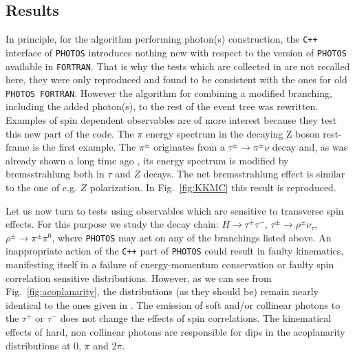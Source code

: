 \documentclass[]{Photos_interface_design}
\begin{document}
\subsection{Results}
\label{sec:results}
In principle, for the algorithm performing photon(s) construction, the {\tt C++} interface of
{\tt PHOTOS} introduces nothing new with respect to the 
version of {\tt PHOTOS} available in {\tt FORTRAN}.
That is why the  tests which are collected in \cite{Photos_tests} are not
recalled here, they were only reproduced and found to be consistent with the ones for
old {\tt PHOTOS FORTRAN}.
However the algorithm for combining a modified branching, including the added 
photon(s), to the rest of the event tree was rewritten.
Examples of spin dependent observables are of more interest because they test this new part of the code.
The $\pi$ energy spectrum in the decaying
Z boson rest-frame is the first example. 
The $\pi^\pm$ originates from a $\tau^\pm \to \pi^\pm \nu $ decay and, 
as was already shown a long time ago \cite{Boillot:1988re}, its energy spectrum is modified by bremsstrahlung both in $\tau$ and $Z$ decays. The net
bremsstrahlung  effect is similar to the one of e.g. $Z$ polarization. In Fig.~\ref{fig:KKMC} this result is reproduced.

Let us now turn to tests using observables which are sensitive to
transverse spin effects.  For this purpose we study the decay chain:
$H\to \tau^+\tau^-$, $\tau^\pm \to \rho^\pm \nu_\tau$, $\rho^\pm \to
\pi^\pm \pi^0$, where {\tt PHOTOS} may act on any of the branchings
listed above. An inappropriate action of the {\tt C++} part of {\tt PHOTOS}
could result in faulty kinematics, manifesting itself in a failure of
energy-momentum conservation or faulty spin
correlation sensitive distributions. However, as we can see from Fig.~\ref{fig:acoplanarity},
 the distributions (as they should be) remain nearly identical to the ones given in
\cite{Davidson:2010rw,tauolaC++}. The emission of soft and/or
collinear photons to the $\tau^+$ or $\tau^-$ does not change the
effects of spin correlations. The kinematical effects of hard,
non collinear  photons are responsible for dips in 
the acoplanarity distributions at $0$, $\pi$ and $2\pi$.
\end{document}
